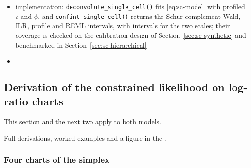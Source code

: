 \begin{itemize}
\begin{itemize}
          covariance is right only at \(a_{i}=1\) (Appendix~\ref{app:which-covariance})
    \item the determinant term of \eqref{eq:sc-loglik} adds information only if the variance function is right;
          otherwise the quasi-score of Section~\ref{sec:generalized-linear-model} is the safer estimator
  \end{itemize}
  \item implementation: \texttt{deconvolute\_single\_cell()} fits \eqref{eq:sc-model} with profiled \(c\) and \(\phi\), and
        \texttt{confint\_single\_cell()} returns the Schur-complement Wald, ILR, profile and REML intervals, with intervals
        for the two scales; their coverage is checked on the calibration design of Section~\ref{sec:sc-synthetic} and
        benchmarked in Section~\ref{sec:sc-hierarchical}
  \item[] 
\end{itemize}

\subsection{Derivation of the constrained likelihood on log-ratio charts}
\label{app:constrained}

This section and the next two apply to both models.

Full derivations, worked examples and a figure in the
.

\subsubsection{Four charts of the simplex}
\label{app:charts}

